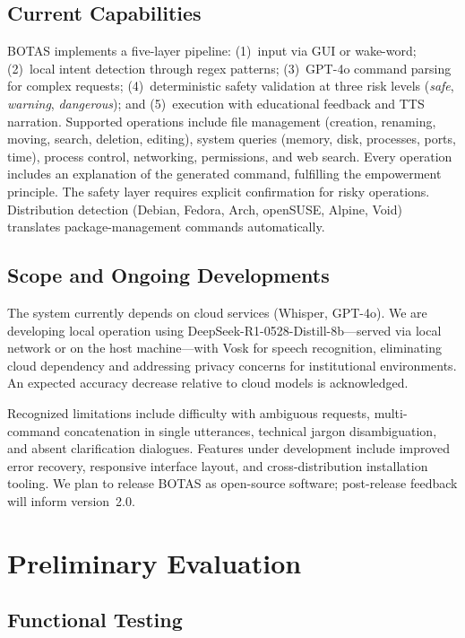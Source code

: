 \documentclass[12pt]{article}
\begin{document}
\subsection{Current Capabilities}
\label{subsec:capabilities}

BOTAS implements a five-layer pipeline: (1)~input via GUI or wake-word;
(2)~local intent detection through regex patterns; (3)~GPT-4o command
parsing for complex requests; (4)~deterministic safety validation at three risk
levels (\textit{safe}, \textit{warning}, \textit{dangerous}); and (5)~execution
with educational feedback and TTS narration. Supported operations include file
management (creation, renaming, moving, search, deletion, editing), system
queries (memory, disk, processes, ports, time), process control, networking,
permissions, and web search. Every operation includes an explanation of the
generated command, fulfilling the empowerment principle. The safety layer requires
explicit confirmation for risky operations. Distribution detection (Debian,
Fedora, Arch, openSUSE, Alpine, Void) translates package-management commands
automatically.

\subsection{Scope and Ongoing Developments}
\label{subsec:scope}

The system currently depends on cloud services (Whisper, GPT-4o). We are
developing local operation using DeepSeek-R1-0528-Distill-8b---served via local
network or on the host machine---with Vosk for speech recognition, eliminating
cloud dependency and addressing privacy concerns for institutional environments.
An expected accuracy decrease relative to cloud models is acknowledged.

Recognized limitations include difficulty with ambiguous requests, multi-command
concatenation in single utterances, technical jargon disambiguation, and absent
clarification dialogues. Features under development include improved error
recovery, responsive interface layout, and cross-distribution installation
tooling. We plan to release BOTAS as open-source software; post-release feedback
will inform version~2.0.


\section{Preliminary Evaluation}
\label{sec:evaluation}

\subsection{Functional Testing}
\label{subsec:testing}
\end{document}
